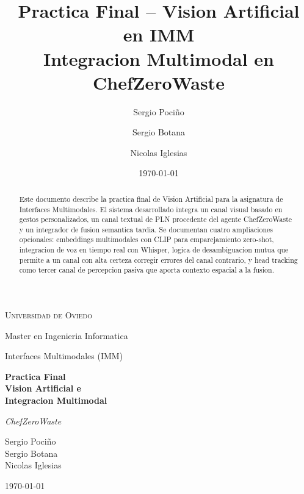 \documentclass[12pt,a4paper]{article}
\title{
    \textbf{Practica Final -- Vision Artificial en IMM}\\
    \large Integracion Multimodal en ChefZeroWaste
}
\author{
    Sergio Pociño \and Sergio Botana \and Nicolas Iglesias
}
\date{\today}
\begin{document}
\begin{titlepage}
    \centering
    \vspace*{2.5cm}

    {\Large\textsc{Universidad de Oviedo}\par}
    \vspace{0.4cm}
    {\large Master en Ingenieria Informatica\par}
    \vspace{0.4cm}
    {\large Interfaces Multimodales (IMM)\par}
    \vspace{2.5cm}

    {\Huge\bfseries Practica Final\\[0.3cm]
    Vision Artificial e\\Integracion Multimodal\par}
    \vspace{1.2cm}
    {\Large\textit{ChefZeroWaste}\par}
    \vspace{3cm}

    {\large
        Sergio Pociño\\[0.25cm]
        Sergio Botana\\[0.25cm]
        Nicolas Iglesias\par}
    \vspace{2cm}

    {\large \today\par}

    \vfill
\end{titlepage}

\thispagestyle{empty}
\tableofcontents
\newpage
\setcounter{page}{1}

\begin{abstract}
Este documento describe la practica final de Vision Artificial para la asignatura de Interfaces Multimodales. El sistema desarrollado integra un canal visual basado en gestos personalizados, un canal textual de PLN procedente del agente ChefZeroWaste y un integrador de fusion semantica tardia. Se documentan cuatro ampliaciones opcionales: embeddings multimodales con CLIP para emparejamiento zero-shot, integracion de voz en tiempo real con Whisper, logica de desambiguacion mutua que permite a un canal con alta certeza corregir errores del canal contrario, y head tracking como tercer canal de percepcion pasiva que aporta contexto espacial a la fusion.
\end{abstract}
\end{document}
